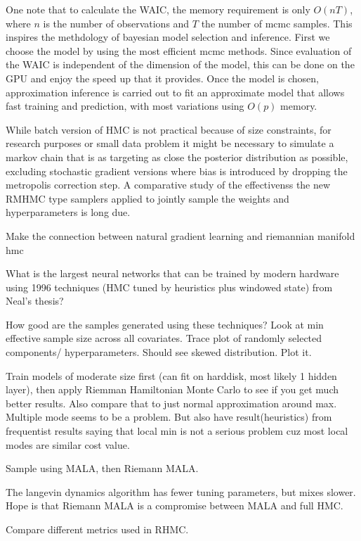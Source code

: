 \documentclass{book}
\begin{document}
\begin{enumerate}
One note that to calculate the WAIC, the memory requirement is only $O(nT)$,
where $n$ is the number of observations and $T$ the number of mcmc samples. This
inspires the methdology of bayesian model selection and inference. First we
choose the model by using the most efficient mcmc methods. Since evaluation of
the WAIC is independent of the dimension of the model, this can be done on the
GPU and enjoy the speed up that it provides. Once the model is chosen,
approximation inference is carried out to fit an approximate model that allows
fast training and prediction, with most variations using $O(p)$ memory.

While batch version of HMC is not practical because of size constraints, for
research purposes or small data problem it might be necessary to simulate a
markov chain that is as targeting as close the posterior distribution as
possible, excluding stochastic gradient versions where bias is introduced by
dropping the metropolis correction step. A comparative study of the effectivenss the new
RMHMC type samplers applied to jointly sample the weights and hyperparameters is
long due. 

Make the connection between natural gradient learning and riemannian manifold
hmc



What is the largest neural networks that can be trained by modern hardware using 1996 techniques (HMC tuned by heuristics plus windowed state) from Neal's thesis?  

How good are the samples generated using these techniques? Look at min effective sample size across all covariates. Trace plot of randomly selected components/ hyperparameters. Should see skewed distribution. Plot it.


Train models of moderate size first (can fit on harddisk, most likely 1 hidden layer), then apply Riemman Hamiltonian Monte Carlo to see if you get much better results. Also compare that to just normal approximation around max. Multiple mode seems to be a problem. But also have result(heuristics) from frequentist results saying that local min is not a serious problem cuz most local modes are similar cost value. 

Sample using MALA, then Riemann MALA.

The langevin dynamics algorithm has fewer tuning parameters, but mixes slower. Hope is that Riemann MALA is a compromise between MALA and full HMC. 

Compare different metrics used in RHMC. 


\end{enumerate}
\end{document}
